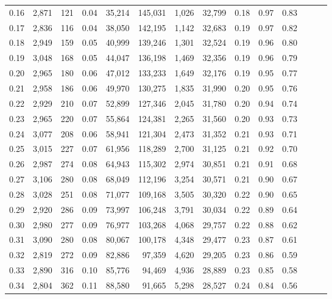\begin{tabular}{rrrrrrrrrrrrrr}
0.16 &  2,871 &  121 &  0.04 &   35,214 &  145,031 &   1,026 &  32,799 &  0.18 &  0.97 &      0.83 \\
0.17 &  2,836 &  116 &  0.04 &   38,050 &  142,195 &   1,142 &  32,683 &  0.19 &  0.97 &      0.82 \\
0.18 &  2,949 &  159 &  0.05 &   40,999 &  139,246 &   1,301 &  32,524 &  0.19 &  0.96 &      0.80 \\
0.19 &  3,048 &  168 &  0.05 &   44,047 &  136,198 &   1,469 &  32,356 &  0.19 &  0.96 &      0.79 \\
0.20 &  2,965 &  180 &  0.06 &   47,012 &  133,233 &   1,649 &  32,176 &  0.19 &  0.95 &      0.77 \\
0.21 &  2,958 &  186 &  0.06 &   49,970 &  130,275 &   1,835 &  31,990 &  0.20 &  0.95 &      0.76 \\
0.22 &  2,929 &  210 &  0.07 &   52,899 &  127,346 &   2,045 &  31,780 &  0.20 &  0.94 &      0.74 \\
0.23 &  2,965 &  220 &  0.07 &   55,864 &  124,381 &   2,265 &  31,560 &  0.20 &  0.93 &      0.73 \\
0.24 &  3,077 &  208 &  0.06 &   58,941 &  121,304 &   2,473 &  31,352 &  0.21 &  0.93 &      0.71 \\
0.25 &  3,015 &  227 &  0.07 &   61,956 &  118,289 &   2,700 &  31,125 &  0.21 &  0.92 &      0.70 \\
0.26 &  2,987 &  274 &  0.08 &   64,943 &  115,302 &   2,974 &  30,851 &  0.21 &  0.91 &      0.68 \\
0.27 &  3,106 &  280 &  0.08 &   68,049 &  112,196 &   3,254 &  30,571 &  0.21 &  0.90 &      0.67 \\
0.28 &  3,028 &  251 &  0.08 &   71,077 &  109,168 &   3,505 &  30,320 &  0.22 &  0.90 &      0.65 \\
0.29 &  2,920 &  286 &  0.09 &   73,997 &  106,248 &   3,791 &  30,034 &  0.22 &  0.89 &      0.64 \\
0.30 &  2,980 &  277 &  0.09 &   76,977 &  103,268 &   4,068 &  29,757 &  0.22 &  0.88 &      0.62 \\
0.31 &  3,090 &  280 &  0.08 &   80,067 &  100,178 &   4,348 &  29,477 &  0.23 &  0.87 &      0.61 \\
0.32 &  2,819 &  272 &  0.09 &   82,886 &   97,359 &   4,620 &  29,205 &  0.23 &  0.86 &      0.59 \\
0.33 &  2,890 &  316 &  0.10 &   85,776 &   94,469 &   4,936 &  28,889 &  0.23 &  0.85 &      0.58 \\
0.34 &  2,804 &  362 &  0.11 &   88,580 &   91,665 &   5,298 &  28,527 &  0.24 &  0.84 &      0.56 \\

\end{tabular}
